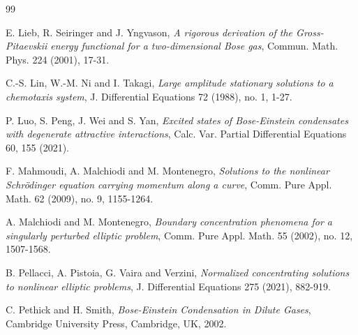 \documentclass[10pt, reqno]{amsart}
\numberwithin{equation}{section}
\theoremstyle{definition}
\begin{document}
{\begin{thebibliography}{99}

E. Lieb, R. Seiringer and J. Yngvason,
\emph{A rigorous derivation of the Gross-Pitaevskii energy functional for a two-dimensional Bose gas},
Commun. Math. Phys.
224 (2001), 17-31.



C.-S. Lin, W.-M. Ni and I. Takagi,
\emph{Large amplitude stationary solutions to a chemotaxis system},
J. Differential Equations
72 (1988), no. 1, 1-27.

P. Luo, S. Peng, J. Wei and S. Yan,
\emph{Excited states of Bose-Einstein condensates with degenerate attractive interactions},
Calc. Var. Partial Differential Equations
60, 155 (2021).




 F. Mahmoudi, A. Malchiodi and M. Montenegro,
\emph{Solutions to the nonlinear Schr\"{o}dinger equation carrying momentum along a curve},
Comm. Pure Appl. Math.
62 (2009), no. 9, 1155-1264.

A. Malchiodi and M. Montenegro,
\emph{Boundary concentration phenomena for a singularly perturbed elliptic problem},
Comm. Pure Appl. Math.
55 (2002), no. 12, 1507-1568.





 B. Pellacci, A. Pistoia, G. Vaira and Verzini,
\emph{Normalized concentrating solutions to nonlinear elliptic problems},
 J. Differential Equations 275 (2021), 882-919.


C. Pethick and H. Smith,
\emph{Bose-Einstein Condensation in Dilute Gases},
 Cambridge University Press, Cambridge, UK, 2002.



\end{thebibliography}}
\end{document}
